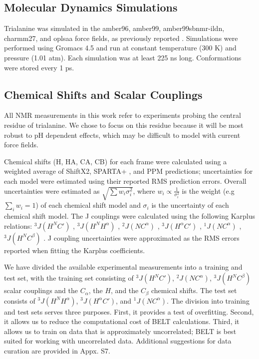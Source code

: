 \documentclass[11pt,titlepage]{article}
\begin{document}
\subsection*{Molecular Dynamics Simulations}

Trialanine was simulated in the amber96\citep{kollman1996}, amber99\citep{wang2000}, amber99sbnmr-ildn\citep{li2010}, charmm27\citep{mackerell2004extending,bjelkmar2010implementation}, and oplsaa\citep{kaminski2001evaluation} force fields, as previously reported \citep{beauchamp2012protein}.  Simulations were performed using Gromacs 4.5 \citep{hess2008} and run at constant temperature (300 K) and pressure (1.01 atm).  Each simulation was at least 225 ns long.  Conformations were stored every 1 ps.  

\subsection*{Chemical Shifts and Scalar Couplings}

All NMR measurements in this work refer to experiments \citep{Graf2007} probing the central residue of trialanine.  We chose to focus on this residue because it will be most robust to pH dependent effects, which may be difficult to model with current force fields.  

Chemical shifts (H, HA, CA, CB) for each frame were calculated using a weighted average of ShiftX2\citep{han2011shiftx2}, SPARTA+ \citep{Shen2010}, and PPM\citep{li2012ppm} predictions; uncertainties for each model were estimated using their reported RMS prediction errors.  Overall uncertainties were estimated as $\sqrt{\sum w_i \sigma_i^2}$, where $w_i \propto \frac{1}{\sigma_i^2}$ is the weight (e.g $\sum_i w_i = 1$) of each chemical shift model and $\sigma_i$ is the uncertainty of each chemical shift model.  The J couplings were calculated using the following Karplus relations: $^3J(H^N C')$ \citep{Schmidt1999}, $^3J(H^N H^\alpha)$ \citep{vogeli2007limits}, $^2J(N C^\alpha)$ \citep{Graf2007}, $^3J(H^\alpha C')$ \citep{Schmidt1999}, $^1J(N C^\alpha)$ \citep{Graf2007}, $^3J(H^N C^\beta)$ \citep{vogeli2007limits}.  J coupling uncertainties were approximated as the RMS errors reported when fitting the Karplus coefficients.  

We have divided the available experimental measurements into a training and test set, with the training set consisting of $^3J(H^N C')$,  $^2J(N C^\alpha)$, $^3J(H^N C^\beta)$ scalar couplings and the $C_\alpha$, the $H$, and the $C_\beta$ chemical shifts.  The test set consists of $^3J(H^N H^\alpha)$, $^3J(H^\alpha C')$, and $^1J(N C^\alpha)$.  The division into training and test sets serves three purposes.  First, it provides a test of overfitting.  Second, it allows us to reduce the computational cost of BELT calculations.  Third, it allows us to train on data that is approximately uncorrelated; BELT is best suited for working with uncorrelated data.  Additional suggestions for data curation are provided in Appx. S7.  
\end{document}
